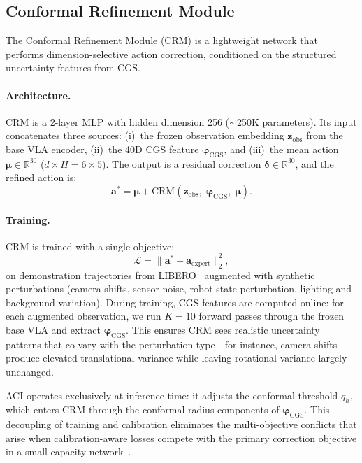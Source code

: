 \subsection{Conformal Refinement Module}
\label{sec:crm}

The Conformal Refinement Module (CRM) is a lightweight network that performs dimension-selective action correction, conditioned on the structured uncertainty features from CGS.

\paragraph{Architecture.}
CRM is a 2-layer MLP with hidden dimension 256 (${\sim}$250K parameters).  Its input concatenates three sources:
(i)~the frozen observation embedding $\mathbf{z}_{\mathrm{obs}}$ from the base VLA encoder,
(ii)~the 40D CGS feature $\boldsymbol{\varphi}_{\mathrm{CGS}}$, and
(iii)~the mean action $\boldsymbol{\mu} \in \mathbb{R}^{30}$ ($d{\times}H = 6{\times}5$).
The output is a residual correction $\boldsymbol{\delta} \in \mathbb{R}^{30}$, and the refined action is:
\begin{equation}
  \mathbf{a}^* = \boldsymbol{\mu} + \mathrm{CRM}(\mathbf{z}_{\mathrm{obs}},\;\boldsymbol{\varphi}_{\mathrm{CGS}},\;\boldsymbol{\mu}).
  \label{eq:crm}
\end{equation}

\paragraph{Training.}
CRM is trained with a single objective:
\begin{equation}
  \mathcal{L} = \bigl\|\mathbf{a}^* - \mathbf{a}_{\mathrm{expert}}\bigr\|_2^2,
  \label{eq:crm_loss}
\end{equation}
on demonstration trajectories from LIBERO~\cite{liberoplus2025} augmented with synthetic perturbations (camera shifts, sensor noise, robot-state perturbation, lighting and background variation).  During training, CGS features are computed online: for each augmented observation, we run $K{=}10$ forward passes through the frozen base VLA and extract $\boldsymbol{\varphi}_{\mathrm{CGS}}$.  This ensures CRM sees realistic uncertainty patterns that co-vary with the perturbation type---for instance, camera shifts produce elevated translational variance while leaving rotational variance largely unchanged.

ACI operates exclusively at inference time: it adjusts the conformal threshold $q_h$, which enters CRM through the conformal-radius components of $\boldsymbol{\varphi}_{\mathrm{CGS}}$.  This decoupling of training and calibration eliminates the multi-objective conflicts that arise when calibration-aware losses compete with the primary correction objective in a small-capacity network~\cite{cploop2025}.

